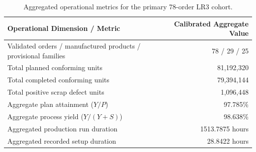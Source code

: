 \begin{table}[!htbp]
\centering
\caption{Aggregated operational metrics for the primary 78-order LR3 cohort.}
\label{tab:primary_cohort_metrics}
\renewcommand{\arraystretch}{1.15}
\small
\begin{tabularx}{\textwidth}{Xr}
\toprule
\textbf{Operational Dimension / Metric} & \textbf{Calibrated Aggregate Value} \\
\midrule
Validated orders / manufactured products / provisional families & 78 / 29 / 25 \\
Total planned conforming units & 81,192,320 \\
Total completed conforming units & 79,394,144 \\
Total positive scrap defect units & 1,096,448 \\
Aggregate plan attainment ($Y / P$) & 97.785\% \\
Aggregate process yield ($Y / (Y + S)$) & 98.638\% \\
Aggregated production run duration & 1513.7875 hours \\
Aggregated recorded setup duration & 28.8422 hours \\
\bottomrule
\end{tabularx}
\end{table}
